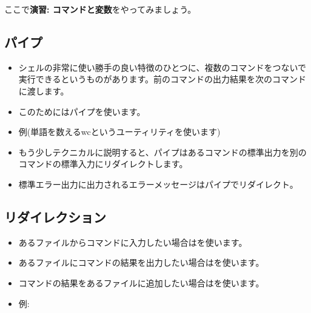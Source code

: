 \documentclass{jsarticle}
\begin{document}
ここで{\bf 演習: コマンドと変数}をやってみましょう。


\subsection{パイプ}


\begin{itemize}
\item シェルの非常に使い勝手の良い特徴のひとつに、複数のコマンドをつないで実行できるというものがあります。前のコマンドの出力結果を次のコマンドに渡します。

\item このためにはパイプ{\color{red}\Q{|}}を使います。

\item 例(単語を数えるwcというユーティリティを使います)

{}

\item もう少しテクニカルに説明すると、パイプはあるコマンドの標準出力を別のコマンドの標準入力にリダイレクトします。

\item 標準エラー出力に出力されるエラーメッセージはパイプでリダイレクト{\color{red}{\bf されません}}。

\end{itemize}


\subsection{リダイレクション}


\begin{itemize}
\item あるファイルからコマンドに入力したい場合は{\color{red}\Q{<}}を使います。
\item あるファイルにコマンドの結果を出力したい場合は{\color{red}\Q{>}}を使います。
\item コマンドの結果をあるファイルに追加したい場合は{\color{red}\Q{>>}}を使います。

\item 例:

{}

\end{itemize}
\end{document}
